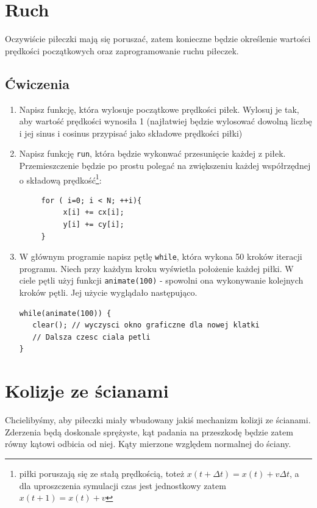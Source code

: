 \documentclass{instrukcja}
\begin{document}
\section{Ruch}

Oczywiście piłeczki mają się poruszać, zatem konieczne będzie określenie wartości prędkości początkowych oraz zaprogramowanie ruchu piłeczek.

\subsection*{Ćwiczenia}

\begin{enumerate}
\item Napisz funkcję, która wylosuje początkowe prędkości piłek. Wylosuj je tak, aby wartość prędkości wynosiła 1 
   (najłatwiej będzie wylosować dowolną liczbę i jej sinus i cosinus przypisać jako składowe prędkości piłki)
\item Napisz funkcję \verb|run|, która będzie wykonwać przesunięcie każdej z piłek. Przemieszczenie będzie po prostu polegać na zwiększeniu każdej współrzędnej o składową prędkość\footnote{piłki poruszają się ze stałą prędkością, toteż \(x(t+\Delta t) = x(t) + v\Delta t \), a dla uproszczenia symulacji czas jest jednostkowy zatem \(x(t+1) = x(t) + v\)}:
\begin{verbatim}
     for ( i=0; i < N; ++i){
          x[i] += cx[i];
          y[i] += cy[i];
     }
\end{verbatim}
\item W głównym programie napisz pętlę \verb|while|, która wykona 50 kroków iteracji programu. Niech przy każdym kroku wyświetla położenie każdej piłki. W ciele pętli użyj funkcji \verb|animate(100)| - spowolni ona wykonywanie kolejnych kroków pętli. Jej użycie wyglądało następująco.
\begin{verbatim}
while(animate(100)) {
   clear(); // wyczysci okno graficzne dla nowej klatki
   // Dalsza czesc ciala petli
}
\end{verbatim}
\end{enumerate}

\section{Kolizje ze ścianami}
Chcielibyśmy, aby piłeczki miały wbudowany jakiś mechanizm kolizji ze ścianami. 
Zderzenia będą doskonale sprężyste, kąt padania na przeszkodę będzie zatem równy kątowi odbicia od niej. Kąty mierzone względem normalnej do ściany.
\end{document}

